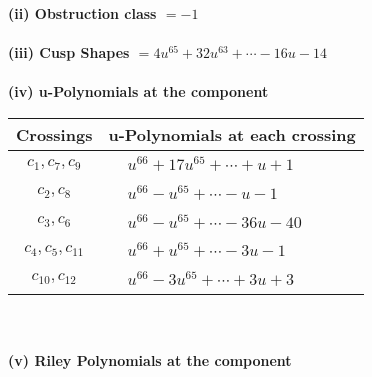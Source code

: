 \documentclass[1p]{elsarticle_modified}
\theoremstyle{definition}
\begin{document}
\flushleft \textbf{(ii) Obstruction class $= -1$}\\~\\
\flushleft \textbf{(iii) Cusp Shapes $= 4 u^{65}+32 u^{63}+\cdots-16 u-14$}\\~\\
\newpage\renewcommand{\arraystretch}{1}
\flushleft \textbf{(iv) u-Polynomials at the component}\newline \\
\begin{tabular}{m{50pt}|m{274pt}}
Crossings & \hspace{64pt}u-Polynomials at each crossing \\
\hline $$\begin{aligned}c_{1},c_{7},c_{9}\end{aligned}$$&$\begin{aligned}
&u^{66}+17 u^{65}+\cdots+u+1
\end{aligned}$\\
\hline $$\begin{aligned}c_{2},c_{8}\end{aligned}$$&$\begin{aligned}
&u^{66}- u^{65}+\cdots- u-1
\end{aligned}$\\
\hline $$\begin{aligned}c_{3},c_{6}\end{aligned}$$&$\begin{aligned}
&u^{66}- u^{65}+\cdots-36 u-40
\end{aligned}$\\
\hline $$\begin{aligned}c_{4},c_{5},c_{11}\end{aligned}$$&$\begin{aligned}
&u^{66}+u^{65}+\cdots-3 u-1
\end{aligned}$\\
\hline $$\begin{aligned}c_{10},c_{12}\end{aligned}$$&$\begin{aligned}
&u^{66}-3 u^{65}+\cdots+3 u+3
\end{aligned}$\\
\hline
\end{tabular}\\~\\
\newpage\renewcommand{\arraystretch}{1}
\flushleft \textbf{(v) Riley Polynomials at the component}\newline \\
\end{document}
